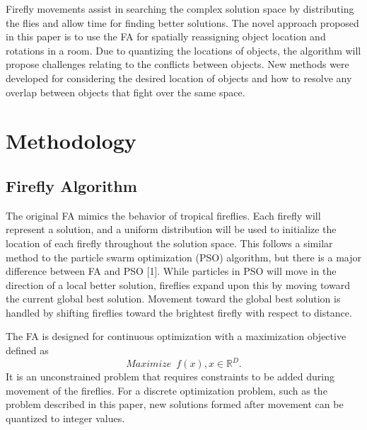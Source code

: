 \documentclass[sigconf,authordraft]{acmart}
\begin{document}
Firefly movements assist in searching the complex solution space by distributing the flies and allow time for finding better solutions. The novel approach proposed in this paper is to use the FA for spatially reassigning object location and rotations in a room. Due to quantizing the locations of objects, the algorithm will propose challenges relating to the conflicts between objects. New methods were developed for considering the desired location of objects and how to resolve any overlap between objects that fight over the same space.


\section{Methodology}
    \subsection{Firefly Algorithm}
    The original FA mimics the behavior of tropical fireflies. Each firefly will represent a solution, and a uniform distribution will be used to initialize the location of each firefly throughout the solution space. This follows a similar method to the particle swarm optimization (PSO) algorithm, but there is a major difference between FA and PSO [1]. While particles in PSO will move in the direction of a local better solution, fireflies expand upon this by moving toward the current global best solution. Movement toward the global best solution is handled by shifting fireflies toward the brightest firefly with respect to distance.

    The FA is designed for continuous optimization with a maximization objective defined as 
    \begin{equation}
    \label{OptObj}
        Maximize\;\: f(x), x \in \mathbb{R}^D.
    \end{equation}
    It is an unconstrained problem that requires constraints to be added during movement of the fireflies. For a discrete optimization problem, such as the problem described in this paper, new solutions formed after movement can be quantized to integer values.
\end{document}
